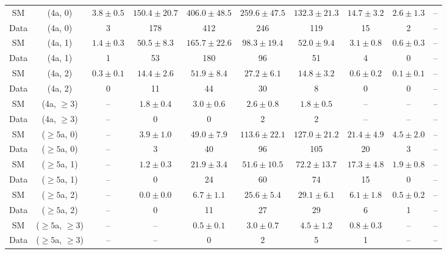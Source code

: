 \begin{table}[h!]
{\begin{tabular}{cccccccccc}
	SM & (4a, 0) & $3.8\pm 0.5$ & $150.4\pm 20.7$ & $406.0\pm 48.5$ & $259.6\pm 47.5$ & $132.3\pm 21.3$ & $14.7\pm 3.2$ & $2.6\pm 1.3$ & -- \\[0.5ex] 
	Data & (4a, 0) & 3 & 178 & 412 & 246 & 119 & 15 & 2 & -- \\[0.5ex] 
	SM & (4a, 1) & $1.4\pm 0.3$ & $50.5\pm 8.3$ & $165.7\pm 22.6$ & $98.3\pm 19.4$ & $52.0\pm 9.4$ & $3.1\pm 0.8$ & $0.6\pm 0.3$ & -- \\[0.5ex] 
	Data & (4a, 1) & 1 & 53 & 180 & 96 & 51 & 4 & 0 & -- \\[0.5ex] 
	SM & (4a, 2) & $0.3\pm 0.1$ & $14.4\pm 2.6$ & $51.9\pm 8.4$ & $27.2\pm 6.1$ & $14.8\pm 3.2$ & $0.6\pm 0.2$ & $0.1\pm 0.1$ & -- \\[0.5ex] 
	Data & (4a, 2) & 0 & 11 & 44 & 30 & 8 & 0 & 0 & -- \\[0.5ex] 
	SM & (4a, $\ge3$) & -- & $1.8\pm 0.4$ & $3.0\pm 0.6$ & $2.6\pm 0.8$ & $1.8\pm 0.5$ & -- & -- & -- \\[0.5ex] 
	Data & (4a, $\ge3$) & -- & 0 & 0 & 2 & 2 & -- & -- & -- \\[0.5ex] 
	SM & ($\ge5$a, 0) & -- & $3.9\pm 1.0$ & $49.0\pm 7.9$ & $113.6\pm 22.1$ & $127.0\pm 21.2$ & $21.4\pm 4.9$ & $4.5\pm 2.0$ & -- \\[0.5ex] 
	Data & ($\ge5$a, 0) & -- & 3 & 40 & 96 & 105 & 20 & 3 & -- \\[0.5ex] 
	SM & ($\ge5$a, 1) & -- & $1.2\pm 0.3$ & $21.9\pm 3.4$ & $51.6\pm 10.5$ & $72.2\pm 13.7$ & $17.3\pm 4.8$ & $1.9\pm 0.8$ & -- \\[0.5ex] 
	Data & ($\ge5$a, 1) & -- & 0 & 24 & 60 & 74 & 15 & 0 & -- \\[0.5ex] 
	SM & ($\ge5$a, 2) & -- & $0.0\pm 0.0$ & $6.7\pm 1.1$ & $25.6\pm 5.4$ & $29.1\pm 6.1$ & $6.1\pm 1.8$ & $0.5\pm 0.2$ & -- \\[0.5ex] 
	Data & ($\ge5$a, 2) & -- & 0 & 11 & 27 & 29 & 6 & 1 & -- \\[0.5ex] 
	SM & ($\ge5$a, $\ge3$) & -- & -- & $0.5\pm 0.1$ & $3.0\pm 0.7$ & $4.5\pm 1.2$ & $0.8\pm 0.3$ & -- & -- \\[0.5ex] 
	Data & ($\ge5$a, $\ge3$) & -- & -- & 0 & 2 & 5 & 1 & -- & -- \\[0.5ex] 
	\hline
	\hline
\end{tabular}}
\end{table}
